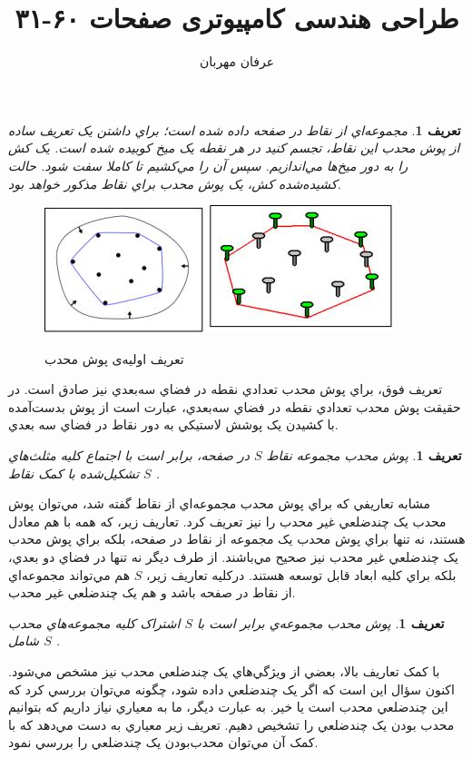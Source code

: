 \documentclass{book}
\author{عرفان مهربان}
\title{طراحی هندسی کامپیوتری صفحات ۶۰-۳۱}
\newtheorem{defn}[section]{تعریف}
\begin{document}
\begin{defn}
    مجموعه‌اي از نقاط در صفحه داده شده است؛ براي داشتن يک تعريف ساده از پوش محدب اين نقاط، تجسم کنيد در هر نقطه يک ميخ کوبيده شده است. يک کش را به دور ميخ‌ها مي‌اندازيم. سپس آن را مي‌کشيم تا کاملا سفت شود. حالت کشيده‌شده‌ کش، يک پوش محدب براي نقاط مذکور خواهد بود.
\end{defn}

\begin{figure}[h!]
    \begin{center}
        \includegraphics{ch1.jpg}
        \label{ch1}
        \caption{تعریف اولیه‌ی پوش محدب}
    \end{center}
\end{figure}

تعريف فوق، براي پوش محدب تعدادي نقطه در فضاي سه‌بعدي نيز صادق است. در حقيقت پوش محدب تعدادي نقطه در فضاي سه‌بعدي، عبارت است از پوش بدست‌آمده با کشيدن يک پوشش لاستيکي به دور نقاط در فضاي سه بعدي.

\begin{defn}
    پوش محدب مجموعه نقاط $S$ در صفحه، برابر است با اجتماع کليه مثلث‌هاي تشکيل‌شده با کمک نقاط $S$ .
\end{defn}

مشابه تعاريفي که براي پوش محدب مجموعه‌اي از نقاط گفته شد، مي‌توان پوش محدب يک چندضلعي غير محدب را نيز تعريف کرد. تعاريف زير، که همه با هم معادل هستند، نه تنها براي پوش محدب يک مجموعه از نقاط در صفحه، بلکه براي پوش محدب يک چندضلعي غير محدب نيز صحيح مي‌باشند. از طرف ديگر نه تنها در فضاي دو بعدي، بلکه براي کليه ابعاد قابل توسعه هستند. درکليه تعاريف زير،  $S$ هم مي‌تواند مجموعه‌اي از نقاط در صفحه باشد و هم يک چندضلعي غير محدب. 

\begin{defn}
    پوش محدب مجموعه‌ي  برابر است با $S$ اشتراک کليه مجموعه‌هاي محدب شامل $S$ .
\end{defn}

با کمک تعاريف بالا، بعضي از ويژگي‌هاي يک چندضلعي محدب نيز مشخص مي‌شود. اکنون سؤال اين است که اگر يک چندضلعي داده شود، چگونه مي‌توان بررسي کرد که اين چندضلعي محدب است يا خير. به عبارت ديگر، ما به معياري نياز داريم که بتوانيم محدب بودن يک چندضلعي را تشخيص دهيم. تعريف زير معياري به دست مي‌دهد که با کمک آن مي‌توان محدب‌بودن يک چندضلعي را بررسي نمود.
\end{document}
